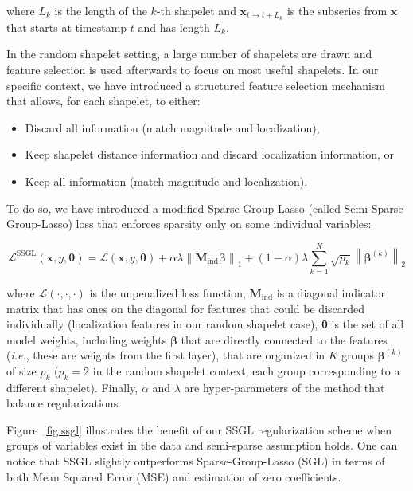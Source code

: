 where $L_k$ is the length of the $k$-th shapelet and
$\mathbf{x}_{t \rightarrow t+L_k}$
is the subseries from $\mathbf{x}$ that starts at timestamp $t$ and has length
$L_k$.

In the random shapelet setting, a large number of shapelets are drawn and
feature selection is used afterwards to focus on most useful shapelets.
In our specific context, we have introduced a structured feature selection
mechanism that allows, for each shapelet, to either:

\begin{itemize}
\item Discard all information (match magnitude and localization),
\item Keep shapelet distance information and discard localization information,
or
\item Keep all information (match magnitude and localization).
\end{itemize}

To do so, we have introduced a modified Sparse-Group-Lasso (called
Semi-Sparse-Group-Lasso) loss that enforces sparsity only on some individual
variables:

\begin{equation}
    \mathcal{L}^{\mathrm{SSGL}}(\mathbf{x}, y, \boldsymbol{\theta}) =
        \mathcal{L}(\mathbf{x}, y, \boldsymbol{\theta})
        + \alpha \lambda
            \left\| \mathbf{M}_\text{ind} \boldsymbol{\beta} \right\|_1
        + (1-\alpha) \lambda \sum_{k=1}^{K} \sqrt{p_k}
            \left\| \boldsymbol{\beta}^{(k)} \right\|_2
\end{equation}

\noindent
where $\mathcal{L}(\cdot,\cdot,\cdot)$ is the unpenalized
loss function,
$\mathbf{M}_\text{ind}$ is a diagonal indicator matrix that has ones on
the diagonal for features that could be discarded individually (localization
features in our random shapelet case), $\boldsymbol{\theta}$ is the set of
all model weights, including weights $\boldsymbol{\beta}$ that are directly
connected to the features (\emph{i.e.}, these are weights from the first layer),
that
are organized in $K$ groups $\boldsymbol{\beta}^{(k)}$ of size $p_k$
($p_k=2$ in the
random shapelet context, each group corresponding to a different shapelet).
Finally, $\alpha$ and $\lambda$ are hyper-parameters of the method that balance
regularizations.

Figure~\ref{fig:ssgl} illustrates the benefit of our SSGL regularization scheme
when groups of variables exist in the data and semi-sparse assumption holds.
One can notice that SSGL slightly outperforms Sparse-Group-Lasso (SGL) in
terms of both Mean Squared Error (MSE) and estimation of zero coefficients.



